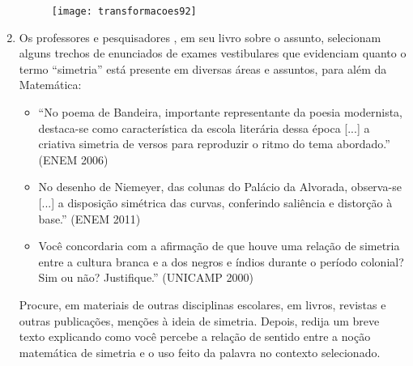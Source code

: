 \begin{enumerate}
\begin{figure}[H]
\centering

\texttt{[image: transformacoes92]}
\end{figure}


\item Os professores e pesquisadores \citeauthor{pasquini2015}, em seu livro sobre o assunto, selecionam alguns trechos de enunciados de exames vestibulares que evidenciam quanto o termo “simetria” está presente em diversas áreas e assuntos, para além da Matemática: 
\begin{itemize}
\item “No poema de Bandeira, importante representante da poesia modernista, destaca-se como característica da escola literária dessa época [...] a criativa simetria de versos para reproduzir o ritmo do tema abordado.” (ENEM 2006)
\item No desenho de Niemeyer, das colunas do Palácio da Alvorada, observa-se [...] a disposição simétrica das curvas, conferindo saliência e distorção à base.” (ENEM 2011)
\item Você concordaria com a afirmação de que houve uma relação de simetria entre a cultura branca e a dos negros e índios durante o período colonial? Sim ou não? Justifique.” (UNICAMP 2000)
\end{itemize}
Procure, em materiais de outras disciplinas escolares, em livros, revistas e outras publicações, menções à ideia de simetria. Depois, redija um breve texto explicando como você percebe a relação de sentido entre a noção matemática de simetria e o uso feito da palavra no contexto selecionado.

\end{enumerate}


